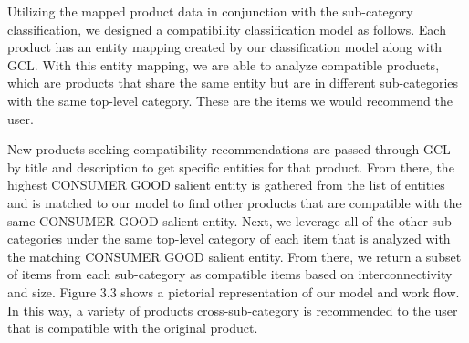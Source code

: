 Utilizing the mapped product data in conjunction with the sub-category classification, we designed a compatibility classification model as follows. Each product has an entity mapping created by our classification model along with GCL. With this entity mapping, we are able to analyze compatible products, which are products that share the same entity but are in different sub-categories with the same top-level category. These are the items we would recommend the user. 

New products seeking compatibility recommendations are passed through GCL by title and description to get specific entities for that product. From there, the highest CONSUMER GOOD salient entity is gathered from the list of entities and is matched to our model to find other products that are compatible with the same CONSUMER GOOD salient entity. Next, we leverage all of the other sub-categories under the same top-level category of each item that is analyzed with the matching CONSUMER GOOD salient entity. From there, we return a subset of items from each sub-category as compatible items based on interconnectivity and size. Figure 3.3 shows a pictorial representation of our model and work flow. In this way, a variety of products cross-sub-category is recommended to the user that is compatible with the original product.









